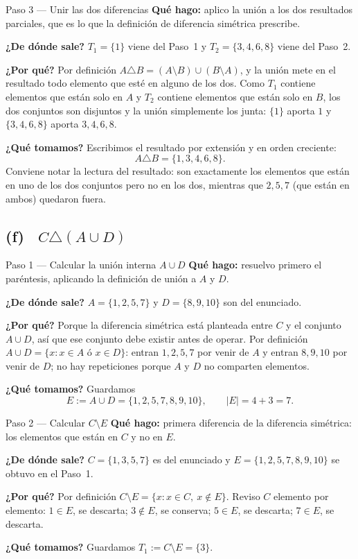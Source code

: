 \documentclass[11pt]{article}
\begin{document}
\begin{paso}{Paso 3 --- Unir las dos diferencias}
\textbf{Qué hago:} aplico la unión a los dos resultados parciales, que es lo que la definición
de diferencia simétrica prescribe.

\textbf{¿De dónde sale?} $T_1=\{1\}$ viene del Paso~1 y $T_2=\{3,4,6,8\}$ viene del Paso~2.

\textbf{¿Por qué?} Por definición $A\triangle B=(A\setminus B)\cup(B\setminus A)$, y la unión
mete en el resultado todo elemento que esté en alguno de los dos. Como $T_1$ contiene
elementos que están solo en $A$ y $T_2$ contiene elementos que están solo en $B$, los dos
conjuntos son disjuntos y la unión simplemente los junta: $\{1\}$ aporta $1$ y
$\{3,4,6,8\}$ aporta $3,4,6,8$.

\textbf{¿Qué tomamos?} Escribimos el resultado por extensión y en orden creciente:
\[
A\triangle B=\{1,3,4,6,8\}.
\]
Conviene notar la lectura del resultado: son exactamente los elementos que están en uno de los
dos conjuntos pero no en los dos, mientras que $2,5,7$ (que están en ambos) quedaron fuera.
\end{paso}

\subsection*{(f) \ $C\triangle(A\cup D)$}

\begin{paso}{Paso 1 --- Calcular la unión interna $A\cup D$}
\textbf{Qué hago:} resuelvo primero el paréntesis, aplicando la definición de unión a $A$ y
$D$.

\textbf{¿De dónde sale?} $A=\{1,2,5,7\}$ y $D=\{8,9,10\}$ son del enunciado.

\textbf{¿Por qué?} Porque la diferencia simétrica está planteada entre $C$ y el conjunto
$A\cup D$, así que ese conjunto debe existir antes de operar. Por definición
$A\cup D=\{x: x\in A \text{ ó } x\in D\}$: entran $1,2,5,7$ por venir de $A$ y entran $8,9,10$
por venir de $D$; no hay repeticiones porque $A$ y $D$ no comparten elementos.

\textbf{¿Qué tomamos?} Guardamos
\[
E:=A\cup D=\{1,2,5,7,8,9,10\},\qquad |E|=4+3=7 .
\]
\end{paso}

\begin{paso}{Paso 2 --- Calcular $C\setminus E$}
\textbf{Qué hago:} primera diferencia de la diferencia simétrica: los elementos que están en
$C$ y no en $E$.

\textbf{¿De dónde sale?} $C=\{1,3,5,7\}$ es del enunciado y $E=\{1,2,5,7,8,9,10\}$ se obtuvo
en el Paso~1.

\textbf{¿Por qué?} Por definición $C\setminus E=\{x: x\in C,\ x\notin E\}$. Reviso $C$
elemento por elemento: $1\in E$, se descarta; $3\notin E$, se conserva; $5\in E$, se
descarta; $7\in E$, se descarta.

\textbf{¿Qué tomamos?} Guardamos $T_1:=C\setminus E=\{3\}$.
\end{paso}
\end{document}
